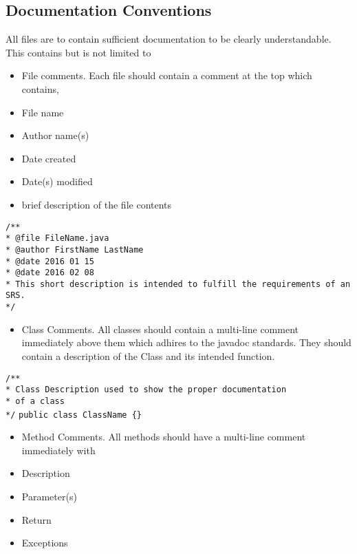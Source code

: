 \documentclass{scrreprt}
\begin{document}
\subsection{Documentation Conventions}
All files are to contain sufficient documentation to be clearly understandable. This 
contains but is not limited to
\begin{itemize}
\item File comments. Each file should contain a comment at the top which contains,
\item File name
\item Author name(s)
\item Date created
\item Date(s) modified
\item brief description of the file contents
\end{itemize}

\texttt{/** \\}
\texttt{* @file FileName.java \\}
\texttt{* @author FirstName LastName\\}
\texttt{* @date 2016 01 15 \\}
\texttt{* @date 2016 02 08\\}
\texttt{* This short description is intended to fulfill the requirements of an SRS. \\}
\texttt{*/ \\}

\begin{itemize}
\item Class Comments. All classes should contain a multi-line comment immediately above them which adhires to 
the javadoc standards. They should contain a description of the Class and its intended function. \\
\end{itemize}

\texttt{/** \\}
\texttt{* Class Description used to show the proper documentation \\}
\texttt{* of a class \\}
\texttt{*/}
\texttt{public class ClassName \{\}}

\begin{itemize}
\item Method Comments. All methods should have a multi-line comment immediately with
\item Description
\item Parameter(s)
\item Return
\item Exceptions
\end{itemize}
\end{document}
